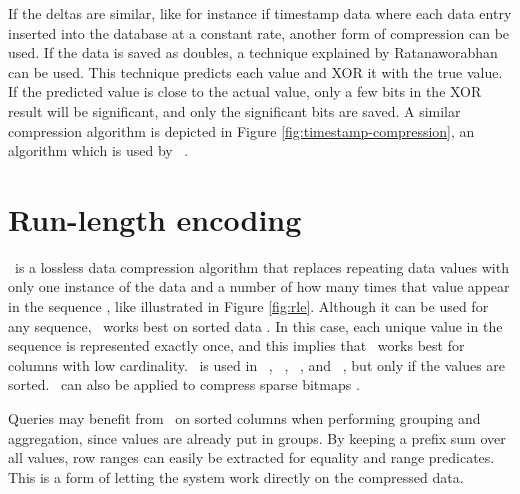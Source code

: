 If the deltas are similar, like for instance if timestamp data where each data entry inserted into the database at a constant rate, another form of compression can be used. If the data is saved as doubles, a technique explained by Ratanaworabhan \ea~\cite{Ratanaworabhan2006-jb} can be used. This technique predicts each value and XOR it with the true value. If the predicted value is close to the actual value, only a few bits in the XOR result will be significant, and only the significant bits are saved. A similar compression algorithm is depicted in Figure \ref{fig:timestamp-compression}, an algorithm which is used by \gorilla~\cite{Pelkonen2015-ko}.

\section{Run-length encoding}
\label{sec:Run-length encoding}
\rle~is a lossless data compression algorithm that replaces repeating data values with only one instance of the data and a number of how many times that value appear in the sequence \cite{Stoimen_undated-js}, like illustrated in Figure \ref{fig:rle}. Although it can be used for any sequence, \rle~works best on sorted data \cite{Bjorklund2011-wh, Holloway2008-rr}. In this case, each unique value in the sequence is represented exactly once, and this implies that \rle~works best for columns with low cardinality. \rle~is used in \cstore~\cite{Stonebraker2005-qz}, \vertica~\cite{Lamb2012-kg}, \oracle~\cite{Oracle2015-fs}, and \sapnw~\cite{Lemke2010-is}, but only if the values are sorted. \rle~can also be applied to compress sparse bitmaps \cite{Stonebraker2005-qz}.

Queries may benefit from \rle~on sorted columns when performing grouping and aggregation, since values are already put in groups. By keeping a prefix sum over all values, row ranges can easily be extracted for equality and range predicates. This is a form of letting the system work directly on the compressed data. 


